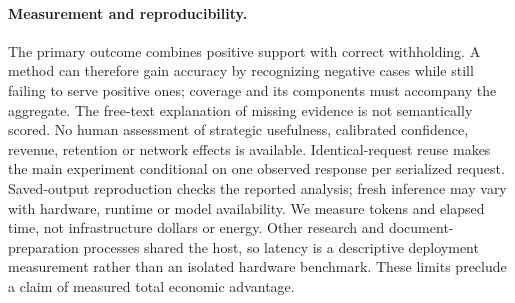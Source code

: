 \paragraph{Measurement and reproducibility.}
The primary outcome combines positive support with correct withholding. A method can therefore gain accuracy by recognizing negative cases while still failing to serve positive ones; coverage and its components must accompany the aggregate. The free-text explanation of missing evidence is not semantically scored. No human assessment of strategic usefulness, calibrated confidence, revenue, retention or network effects is available. Identical-request reuse makes the main experiment conditional on one observed response per serialized request. Saved-output reproduction checks the reported analysis; fresh inference may vary with hardware, runtime or model availability. We measure tokens and elapsed time, not infrastructure dollars or energy. Other research and document-preparation processes shared the host, so latency is a descriptive deployment measurement rather than an isolated hardware benchmark. These limits preclude a claim of measured total economic advantage.
